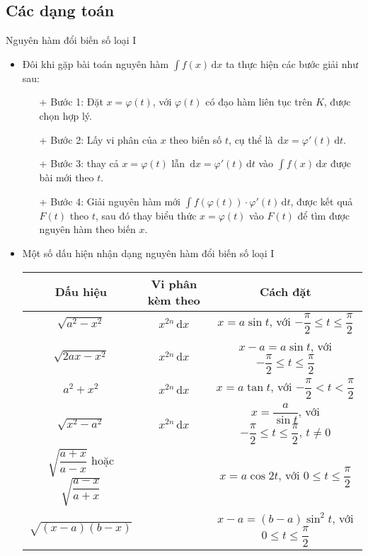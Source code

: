 \subsection{Các dạng toán}
\begin{dang}{Nguyên hàm đổi biến số loại I}
	\begin{itemize}
		\item Đôi khi gặp bài toán nguyên hàm $\displaystyle\int{f(x)\mathrm{\,d}x}$ ta thực hiện các bước giải như sau:
		\begin{itemize}
			\item[+] Bước 1: Đặt $x=\varphi(t)$, với $\varphi(t)$ có đạo hàm liên tục trên $K$, được chọn hợp lý.
			\item[+] Bước 2: Lấy vi phân của $x$ theo biến số $t$, cụ thể là $\mathrm{\,d}x=\varphi'(t)\mathrm{\,d}t$.
			\item[+] Bước 3: thay cả $x=\varphi(t)$ lẫn $\mathrm{\,d}x=\varphi'(t)\mathrm{\,d}t$ vào $\displaystyle\int{f(x)\mathrm{\,d}x}$ được bài mới theo $t$.
			\item[+] Bước 4: Giải nguyên hàm mới $\displaystyle\int{f\left(\varphi(t) \right)\cdot\varphi'(t)\mathrm{\,d}t}$, được kết quả $F(t)$ theo $t$, sau đó thay biểu thức $x=\varphi(t)$ vào $F(t)$ để tìm được nguyên hàm theo biến $x$.
		\end{itemize}
		\item Một số dấu hiện nhận dạng nguyên hàm đổi biến số loại I
			\renewcommand\arraystretch{2}
			\begin{longtable}{|c|c|c|}
				\hline
				\textbf{Dấu hiệu}&\textbf{Vi phân kèm theo}&\textbf{Cách đặt}\\
				\hline
				$\sqrt{a^2-x^2}$&$x^{2n}\mathrm{\,d}x$&$x=a\sin t$, với $-\dfrac{\pi}{2}\leqslant t \leqslant \dfrac{\pi}{2}$\\
				\hline
				$\sqrt{2ax-x^2}$&$x^{2n}\mathrm{\,d}x$&$x-a=a\sin t$, với $-\dfrac{\pi}{2}\leqslant t \leqslant \dfrac{\pi}{2}$\\
				\hline
				$a^2+x^2$&$x^{2n}\mathrm{\,d}x$&$x=a\tan t$, với $-\dfrac{\pi}{2} < t < \dfrac{\pi}{2}$\\
				\hline
				$\sqrt{x^2-a^2}$&$x^{2n}\mathrm{\,d}x$&$x=\dfrac{a}{\sin t}$, với $-\dfrac{\pi}{2}\leqslant t \leqslant \dfrac{\pi}{2},\,t \ne 0$\\
				\hline
				$\sqrt{\dfrac{a+x}{a-x}}$ hoặc $\sqrt{\dfrac{a-x}{a+x}}$& &$x=a\cos 2t$, với $0 \leqslant t \leqslant \dfrac{\pi}{2}$\\
				\hline
				$\sqrt{(x-a)(b-x)}$& &$x-a=(b-a)\sin^2t$, với $0 \leqslant t \leqslant \dfrac{\pi}{2}$\\
				\hline
			\end{longtable}\vspace{-0.1cm}
	\end{itemize}
\end{dang}
